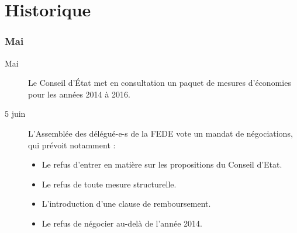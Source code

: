 
\chapter{Historique}%
\subsection*{Mai}%
\begin{description}%
	\item[Mai]%
		Le Conseil d'État met en consultation un paquet de mesures d'économies pour les années 2014 à 2016.

	\item[5 juin]%
		L’Assemblée des délégué-e-s de la FEDE vote un mandat de
		négociations, qui prévoit notamment :
		\begin{itemize}
			\item Le refus d’entrer en matière sur les propositions du Conseil d’Etat.
			\item Le refus de toute mesure structurelle.
			\item L’introduction d’une clause de remboursement.
			\item Le refus de négocier au-delà de l’année 2014.
		\end{itemize}
\end{description}

